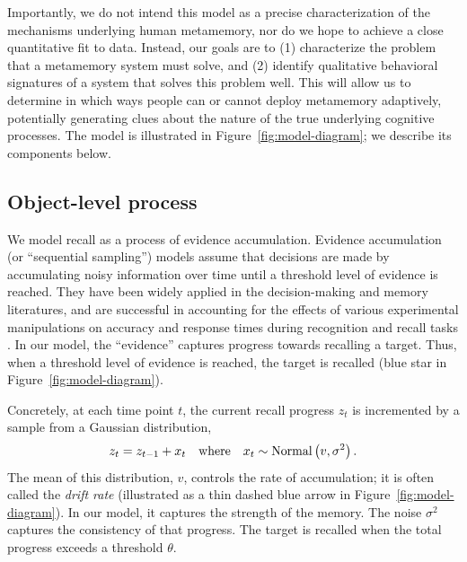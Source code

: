 Importantly, we do not intend this model as a precise characterization of the mechanisms underlying human metamemory, nor do we hope to achieve a close quantitative fit to data. Instead, our goals are to (1) characterize the problem that a metamemory system must solve, and (2) identify qualitative behavioral signatures of a system that solves this problem well. This will allow us to determine in which ways people can or cannot deploy metamemory adaptively, potentially generating clues about the nature of the true underlying cognitive processes.
The model is illustrated in Figure~\ref{fig:model-diagram}; we describe its components below.

\subsection{Object-level process}

We model recall as a process of evidence accumulation. Evidence accumulation (or ``sequential sampling'') models assume that decisions are made by accumulating noisy information over time until a threshold level of evidence is reached. They have been widely applied in the decision-making \citep{busemeyer1993decision,usher2001time,ditterich2006stochastic,krajbich2010visual} and memory \citep{ratcliff1978theory,sederberg2008context} literatures, and are successful in accounting for the effects of various experimental manipulations on accuracy and response times during recognition and recall tasks \citep{ratcliff2002estimating,sederberg2008context,yonelinas2010recollection}. In our model, the ``evidence'' captures progress towards recalling a target. Thus, when a threshold level of evidence is reached, the target is recalled (blue star in Figure~\ref{fig:model-diagram}).

Concretely, at each time point $t$, the current recall progress $z_t$ is incremented by a sample from a Gaussian distribution,
%
\begin{equation}\label{eq:evidence}
  z_t = z_{t-1} + x_t \quad\text{where}\quad
  x_t \sim \mathrm{Normal}\left( v, \sigma^2 \right).
\end{equation}
%
The mean of this distribution, $v$, controls the rate of accumulation; it is often called the \emph{drift rate} (illustrated as a thin dashed blue arrow in Figure~\ref{fig:model-diagram}). In our model, it captures the strength of the memory. The noise $\sigma^2$ captures the consistency of that progress. The target is recalled when the total progress exceeds a threshold $\theta$.

